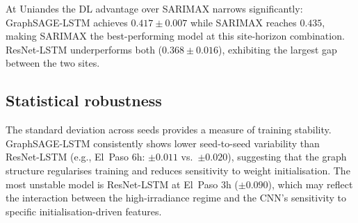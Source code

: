 At Uniandes the DL advantage over SARIMAX narrows significantly: GraphSAGE-LSTM
achieves $0.417 \pm 0.007$ while SARIMAX reaches $0.435$, making SARIMAX the
best-performing model at this site-horizon combination. ResNet-LSTM underperforms
both ($0.368 \pm 0.016$), exhibiting the largest gap between the two sites.

\subsection{Statistical robustness}

The standard deviation across seeds provides a measure of training stability.
GraphSAGE-LSTM consistently shows lower seed-to-seed variability than ResNet-LSTM
(e.g., El~Paso 6h: $\pm 0.011$ vs.\ $\pm 0.020$), suggesting that the graph
structure regularises training and reduces sensitivity to weight initialisation.
The most unstable model is ResNet-LSTM at El~Paso 3h ($\pm 0.090$), which may
reflect the interaction between the high-irradiance regime and the CNN's sensitivity
to specific initialisation-driven features.
